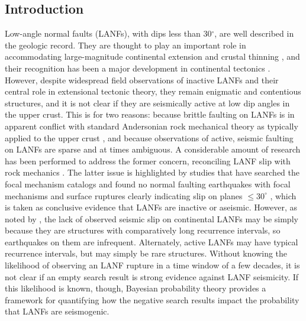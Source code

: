 \documentclass[draft,grl]{AGUTeX}
\begin{document}
\begin{article}

\section{Introduction}
Low-angle normal faults (LANFs), with dips less than 30$^\circ$, are well
described in the geologic record. They are thought to play an important role in
accommodating large-magnitude continental extension \citep{howard1987crustal}
and crustal thinning \citep{lister1986detachment}, and their recognition has
been a major development in continental tectonics
\citep{wernicke2009detachment}. However, despite widespread field observations
of inactive LANFs and their central role in extensional tectonic theory, they
remain enigmatic and contentious structures, and it is not clear if they are
seismically active at low dip angles in the upper crust. This is for two
reasons: because brittle faulting on LANFs is in apparent conflict with
standard Andersonian rock mechanical theory as typically applied to the upper
crust \citep{axen2004lanfmech}, and because observations of active, seismic
faulting on LANFs are sparse and at times ambiguous. A considerable amount of
research has been performed to address the former concern, reconciling LANF
slip with rock mechanics \citep [e.g.,] []{axenbartley1997,
collettini2011lanfmech}. The latter issue is highlighted by studies that have
searched the focal mechanism catalogs and found no normal faulting earthquakes
with focal mechanisms and surface ruptures clearly indicating slip on planes
$\le30^\circ$ \citep{jackson1987, collettinisibson2001}, which is taken as
conclusive evidence that LANFs are inactive or aseismic. However, as noted by
\citet{wernicke1995seis}, the lack of observed seismic slip on continental
LANFs may be simply because they are structures with comparatively long
recurrence intervals, so earthquakes on them are infrequent. Alternately,
active LANFs may have typical recurrence intervals, but may simply be rare
structures. Without knowing the likelihood of observing an LANF rupture in
a time window of a few decades, it is not clear if an empty search result is
strong evidence against LANF seismicity. If this likelihood is known, though,
Bayesian probability theory provides a framework for quantifying how the
negative search results impact the probability that LANFs are seismogenic.


\end{article}
\end{document}
